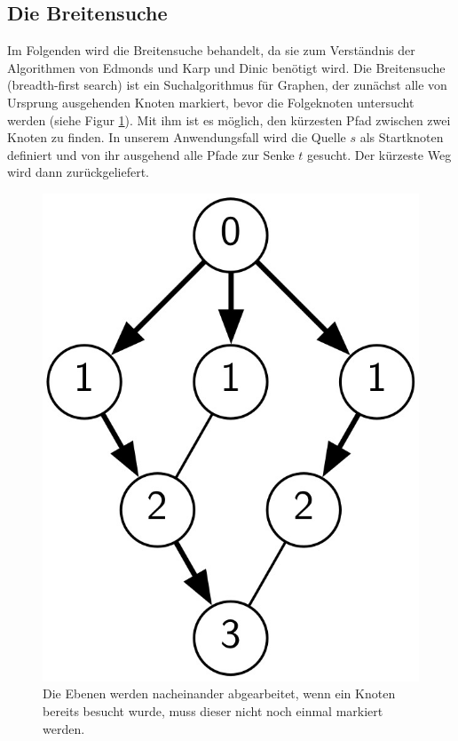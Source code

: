 \documentclass[a4paper]{llncs}
\begin{document}
\subsection{Die Breitensuche}
\label{Breitensuche}
Im Folgenden wird die Breitensuche behandelt, da sie zum Verständnis der Algorithmen von Edmonds und Karp und Dinic benötigt wird.
Die Breitensuche (breadth-first search) ist ein Suchalgorithmus für Graphen, der zunächst alle von Ursprung ausgehenden Knoten markiert, bevor die Folgeknoten untersucht werden (siehe Figur \ref{fig:Graph2}).
Mit ihm ist es möglich, den kürzesten Pfad zwischen zwei Knoten zu finden.
In unserem Anwendungsfall wird die Quelle $s$ als Startknoten definiert und von ihr ausgehend alle Pfade zur Senke $t$ gesucht. Der kürzeste Weg wird dann zurückgeliefert.
\begin{figure}[htbp] 
  \centering
     \includegraphics[scale=0.14]{BreitensucheGraph} 
  \caption{Die Ebenen werden nacheinander abgearbeitet, wenn ein Knoten bereits besucht wurde, muss dieser nicht noch einmal markiert werden.}
  \label{fig:Graph2}
\end{figure}
\end{document}
